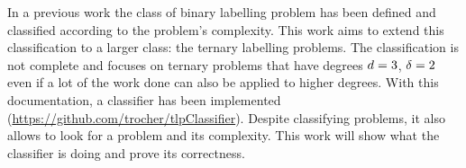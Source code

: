 In a previous work \cite{1} the class of binary labelling problem has been defined and classified according to the problem's complexity. This work aims to extend this classification to a larger class: the ternary labelling problems. The classification is not complete and focuses on ternary problems that have degrees $d = 3$, $\delta = 2$ even if a lot of the work done can also be applied to higher degrees. With this documentation, a classifier has been implemented (\hyperlink{https://github.com/trocher/tlpClassifier}{https://github.com/trocher/tlpClassifier}). Despite classifying problems, it also allows to look for a problem and its complexity. This work will show what the classifier is doing and prove its correctness.